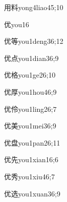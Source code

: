 \begin{verbete}{用料}{yong4liao4}{5;10}
\end{verbete}

\begin{verbete}{优}{you1}{6}
\end{verbete}

\begin{verbete}{优等}{you1deng3}{6;12}
\end{verbete}

\begin{verbete}{优点}{you1dian3}{6;9}
\end{verbete}

\begin{verbete}{优格}{you1ge2}{6;10}
\end{verbete}

\begin{verbete}{优厚}{you1hou4}{6;9}
\end{verbete}

\begin{verbete}{优伶}{you1ling2}{6;7}
\end{verbete}

\begin{verbete}{优美}{you1mei3}{6;9}
\end{verbete}

\begin{verbete}{优盘}{you1pan2}{6;11}
\end{verbete}

\begin{verbete}{优先}{you1xian1}{6;6}
\end{verbete}

\begin{verbete}{优秀}{you1xiu4}{6;7}
\end{verbete}

\begin{verbete}{优选}{you1xuan3}{6;9}
\end{verbete}

